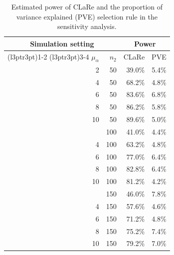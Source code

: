 \begin{table}[htbp]
\centering
\caption{Estimated power of CLaRe and the proportion of variance explained (PVE) selection rule in the sensitivity analysis.}
\label{tab:quantile-sensitivity-analysis}

\begin{tabular}{rrrr}
\toprule
\multicolumn{2}{c}{Simulation setting} & \multicolumn{2}{c}{Power} \\
\cmidrule(l{3pt}r{3pt}){1-2} \cmidrule(l{3pt}r{3pt}){3-4}
$\mu_{\alpha}$ & $n_2$ & CLaRe & PVE\\
\midrule
2 & 50 & 39.0\% & 5.4\%\\
4 & 50 & 68.2\% & 4.8\%\\
6 & 50 & 83.6\% & 6.8\%\\
8 & 50 & 86.2\% & 5.8\%\\
10 & 50 & 89.6\% & 5.0\%\\
\addlinespace
2 & 100 & 41.0\% & 4.4\%\\
4 & 100 & 63.2\% & 4.8\%\\
6 & 100 & 77.0\% & 6.4\%\\
8 & 100 & 82.8\% & 6.4\%\\
10 & 100 & 81.2\% & 4.2\%\\
\addlinespace
2 & 150 & 46.0\% & 7.8\%\\
4 & 150 & 57.6\% & 4.6\%\\
6 & 150 & 71.2\% & 4.8\%\\
8 & 150 & 75.2\% & 7.4\%\\
10 & 150 & 79.2\% & 7.0\%\\
\bottomrule
\end{tabular}
\end{table}
